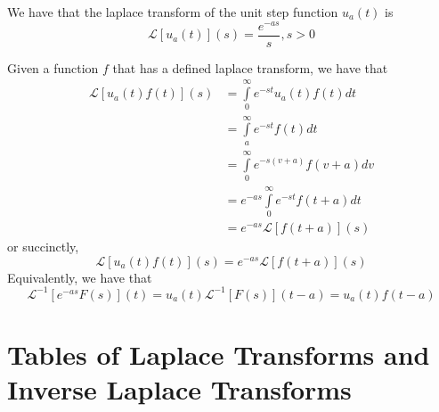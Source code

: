 

\begin{props}
        We have that the laplace transform of the unit step function $u_a(t)$ is \begin{equation}
                \mathcal{L}[u_a(t)](s) = \frac{e^{-as}}{s}, s > 0
        \end{equation}
\end{props}



\begin{props}
        Given a function $f$ that has a defined laplace transform, we have that \begin{align*}
                \mathcal{L}[u_a(t)f(t)](s) &= \int\limits_{0}^{\infty}e^{-st}u_a(t)f(t)dt \\
                &= \int\limits_{a}^{\infty}e^{-st}f(t)dt\tag{take $v = t - a$, $dv=dt$} \\
                &= \int\limits_{0}^{\infty}e^{-s(v+a)}f(v+a)dv\tag{shift $v \rightarrow t$} \\
                &= e^{-as}\int\limits_{0}^{\infty}e^{-st}f(t+a)dt \\
                &= e^{-as}\mathcal{L}[f(t+a)](s)
        \end{align*}
        or succinctly, \begin{equation}
                \mathcal{L}[u_a(t)f(t)](s) = e^{-as}\mathcal{L}[f(t+a)](s)
        \end{equation}
        Equivalently, we have that \begin{equation}
                \mathcal{L}^{-1}[e^{-as}F(s)](t) = u_a(t)\mathcal{L}^{-1}[F(s)](t-a) = u_a(t)f(t-a)
        \end{equation}
\end{props}






\section{Tables of Laplace Transforms and Inverse Laplace Transforms}


